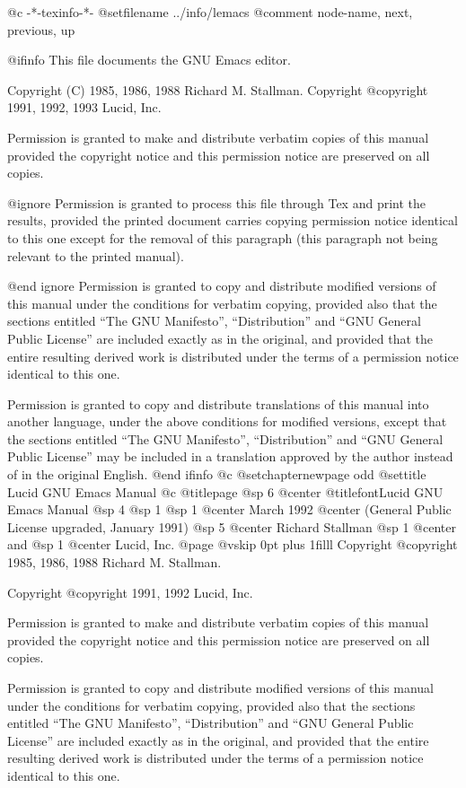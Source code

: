   @c -*-texinfo-*-
@setfilename ../info/lemacs
@comment  node-name,  next,  previous,  up


@ifinfo
This file documents the GNU Emacs editor.

Copyright (C) 1985, 1986, 1988 Richard M. Stallman.
Copyright @copyright{} 1991, 1992, 1993 Lucid, Inc.

Permission is granted to make and distribute verbatim copies of
this manual provided the copyright notice and this permission notice
are preserved on all copies.

@ignore
Permission is granted to process this file through Tex and print the
results, provided the printed document carries copying permission
notice identical to this one except for the removal of this paragraph
(this paragraph not being relevant to the printed manual).

@end ignore
Permission is granted to copy and distribute modified versions of this
manual under the conditions for verbatim copying, provided also that the
sections entitled ``The GNU Manifesto'', ``Distribution'' and ``GNU
General Public License'' are included exactly as in the original, and
provided that the entire resulting derived work is distributed under the
terms of a permission notice identical to this one.

Permission is granted to copy and distribute translations of this manual
into another language, under the above conditions for modified versions,
except that the sections entitled ``The GNU Manifesto'',
``Distribution'' and ``GNU General Public License'' may be included in a
translation approved by the author instead of in the original English.
@end ifinfo
@c
@setchapternewpage odd
@settitle Lucid GNU Emacs Manual
@c
@titlepage
@sp 6
@center @titlefont{Lucid GNU Emacs Manual}
@sp 4
@sp 1
@sp 1
@center March 1992
@center (General Public License upgraded, January 1991)
@sp 5
@center Richard Stallman
@sp 1
@center and
@sp 1
@center Lucid, Inc.
@page
@vskip 0pt plus 1filll
Copyright @copyright{} 1985, 1986, 1988 Richard M. Stallman.

Copyright @copyright{} 1991, 1992 Lucid, Inc.

Permission is granted to make and distribute verbatim copies of
this manual provided the copyright notice and this permission notice
are preserved on all copies.

Permission is granted to copy and distribute modified versions of this
manual under the conditions for verbatim copying, provided also that the
sections entitled ``The GNU Manifesto'', ``Distribution'' and ``GNU
General Public License'' are included exactly as in the original, and
provided that the entire resulting derived work is distributed under the
terms of a permission notice identical to this one.

